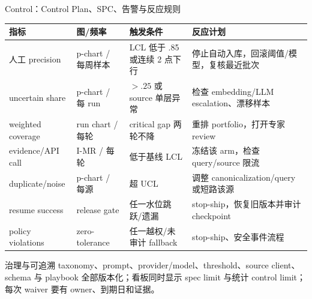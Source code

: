 \begin{frame}{Control：Control Plan、SPC、告警与反应规则}
\scriptsize
\begin{tabularx}{\textwidth}{p{} p{} p{} X}
\toprule
指标 & 图/频率 & 触发条件 & 反应计划 \\
\midrule
人工 precision & p-chart / 每周样本 & LCL 低于 .85 或连续 2 点下行 & 停止自动入库，回滚阈值/模型，复核最近批次 \\
uncertain share & p-chart / 每 run & $> .25$ 或 source 单层异常 & 检查 embedding/LLM escalation、漂移样本 \\
weighted coverage & run chart / 每轮 & critical gap 两轮不降 & 重排 portfolio，打开专家 review \\
evidence/API call & I-MR / 每轮 & 低于基线 LCL & 冻结该 arm，检查 query/source 限流 \\
duplicate/noise & p-chart / 每源 & 超 UCL & 调整 canonicalization/query 或短路该源 \\
resume success & release gate & 任一水位跳跃/遗漏 & stop-ship，恢复旧版本并审计 checkpoint \\
policy violations & zero-tolerance & 任一越权/未审计 fallback & stop-ship、安全事件流程 \\
\bottomrule
\end{tabularx}

\vspace{0.5em}
\begin{block}{治理与可追溯}
taxonomy、prompt、provider/model、threshold、source client、schema 与 playbook 全部版本化；看板同时显示 spec limit 与统计 control limit；每次 waiver 要有 owner、到期日和证据。
\end{block}
\end{frame}

